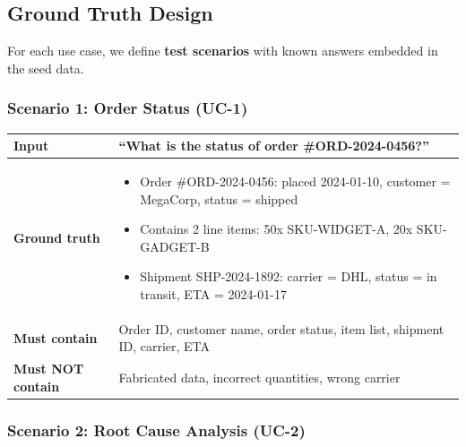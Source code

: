 \documentclass[11pt,a4paper]{article}
\begin{document}
\subsection{Ground Truth Design}

For each use case, we define \textbf{test scenarios} with known answers embedded in the seed data.

\subsubsection{Scenario 1: Order Status (UC-1)}

\begin{table}[H]
\centering\small
\begin{tabularx}{\textwidth}{@{} l X @{}}
\toprule
\textbf{Input}        & ``What is the status of order \#ORD-2024-0456?'' \\
\midrule
\textbf{Ground truth} &
    \begin{itemize}[nosep,leftmargin=1em]
        \item Order \#ORD-2024-0456: placed 2024-01-10, customer = MegaCorp, status = shipped
        \item Contains 2 line items: 50x SKU-WIDGET-A, 20x SKU-GADGET-B
        \item Shipment SHP-2024-1892: carrier = DHL, status = in transit, ETA = 2024-01-17
    \end{itemize} \\
\textbf{Must contain}  & Order ID, customer name, order status, item list, shipment ID, carrier, ETA \\
\textbf{Must NOT contain} & Fabricated data, incorrect quantities, wrong carrier \\
\bottomrule
\end{tabularx}
\end{table}

\subsubsection{Scenario 2: Root Cause Analysis (UC-2)}
\end{document}
